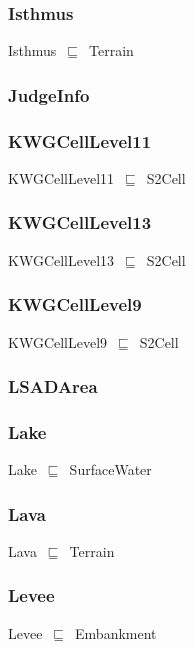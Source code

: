 \documentclass{article}
\begin{document}
\subsubsection*{Isthmus}

Isthmus~\ensuremath{\sqsubseteq}~Terrain~

\subsubsection*{JudgeInfo}

\subsubsection*{KWGCellLevel11}

KWGCellLevel11~\ensuremath{\sqsubseteq}~S2Cell~

\subsubsection*{KWGCellLevel13}

KWGCellLevel13~\ensuremath{\sqsubseteq}~S2Cell~

\subsubsection*{KWGCellLevel9}

KWGCellLevel9~\ensuremath{\sqsubseteq}~S2Cell~

\subsubsection*{LSADArea}

\subsubsection*{Lake}

Lake~\ensuremath{\sqsubseteq}~SurfaceWater~

\subsubsection*{Lava}

Lava~\ensuremath{\sqsubseteq}~Terrain~

\subsubsection*{Levee}

Levee~\ensuremath{\sqsubseteq}~Embankment~
\end{document}
